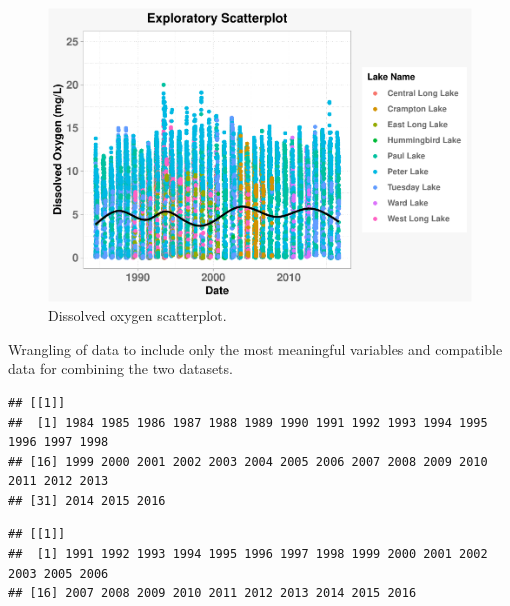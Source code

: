 \documentclass[12pt,]{article}
\newenvironment{Shaded}{\begin{snugshade}}{\end{snugshade}}
\newcommand{\CommentTok}[1]{\textcolor[rgb]{0.56,0.35,0.01}{\textit{#1}}}
\newcommand{\KeywordTok}[1]{\textcolor[rgb]{0.13,0.29,0.53}{\textbf{#1}}}
\newcommand{\NormalTok}[1]{#1}
\newcommand{\OperatorTok}[1]{\textcolor[rgb]{0.81,0.36,0.00}{\textbf{#1}}}
\begin{document}
\begin{figure}
\centering
\includegraphics{Eadala_ENV872_Project_files/figure-latex/fig4-1.pdf}
\caption{Dissolved oxygen scatterplot.}
\end{figure}

Wrangling of data to include only the most meaningful variables and
compatible data for combining the two datasets.

\begin{Shaded}
\end{Shaded}

\begin{verbatim}
## [[1]]
##  [1] 1984 1985 1986 1987 1988 1989 1990 1991 1992 1993 1994 1995 1996 1997 1998
## [16] 1999 2000 2001 2002 2003 2004 2005 2006 2007 2008 2009 2010 2011 2012 2013
## [31] 2014 2015 2016
\end{verbatim}

\begin{Shaded}
\end{Shaded}

\begin{verbatim}
## [[1]]
##  [1] 1991 1992 1993 1994 1995 1996 1997 1998 1999 2000 2001 2002 2003 2005 2006
## [16] 2007 2008 2009 2010 2011 2012 2013 2014 2015 2016
\end{verbatim}
\end{document}
